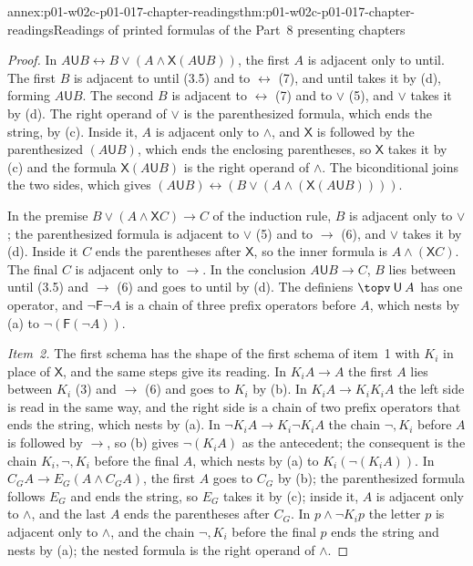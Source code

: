 \begin{annexitem}{annex:p01-w02c-p01-017-chapter-readings}{thm:p01-w02c-p01-017-chapter-readings}{Readings of printed formulas of the Part~8 presenting chapters}
\begin{proof}
In \(A\mathbin{\mathsf U}B\leftrightarrow B\lor(A\land\mathsf
X(A\mathbin{\mathsf U}B))\), the first \(A\) is adjacent only to until.
The first \(B\) is adjacent to until (3.5) and to \(\leftrightarrow\)
(7), and until takes it by (d), forming \(A\mathbin{\mathsf U}B\).  The
second \(B\) is adjacent to \(\leftrightarrow\) (7) and to \(\lor\) (5),
and \(\lor\) takes it by (d).  The right operand of \(\lor\) is the
parenthesized formula, which ends the string, by (c).  Inside it, \(A\) is
adjacent only to \(\land\), and \(\mathsf X\) is followed by the
parenthesized \((A\mathbin{\mathsf U}B)\), which ends the enclosing
parentheses, so \(\mathsf X\) takes it by (c) and the formula
\(\mathsf X(A\mathbin{\mathsf U}B)\) is the right operand of \(\land\).
The biconditional joins the two sides, which gives
\((A\mathbin{\mathsf U}B)\leftrightarrow(B\lor(A\land(\mathsf
X(A\mathbin{\mathsf U}B))))\).

In the premise \(B\lor(A\land\mathsf XC)\to C\) of the induction rule,
\(B\) is adjacent only to \(\lor\); the parenthesized formula is adjacent
to \(\lor\) (5) and to \(\to\) (6), and \(\lor\) takes it by (d).  Inside
it \(C\) ends the parentheses after \(\mathsf X\), so the inner formula is
\(A\land(\mathsf XC)\).  The final \(C\) is adjacent only to \(\to\).  In
the conclusion \(A\mathbin{\mathsf U}B\to C\), \(B\) lies between until
(3.5) and \(\to\) (6) and goes to until by (d).  The definiens
\(\topv\mathbin{\mathsf U}A\) has one operator, and
\(\neg\mathsf F\neg A\) is a chain of three prefix operators before
\(A\), which nests by (a) to \(\neg(\mathsf F(\neg A))\).

\emph{Item~2.}  The first schema has the shape of the first schema of
item~1 with \(K_i\) in place of \(\mathsf X\), and the same steps give its
reading.  In \(K_iA\to A\) the first \(A\) lies between \(K_i\) (3) and
\(\to\) (6) and goes to \(K_i\) by (b).  In \(K_iA\to K_iK_iA\) the left
side is read in the same way, and the right side is a chain of two prefix
operators that ends the string, which nests by (a).  In
\(\neg K_iA\to K_i\neg K_iA\) the chain \(\neg,K_i\) before \(A\) is
followed by \(\to\), so (b) gives \(\neg(K_iA)\) as the antecedent; the
consequent is the chain \(K_i,\neg,K_i\) before the final \(A\), which
nests by (a) to \(K_i(\neg(K_iA))\).  In
\(C_GA\to E_G(A\land C_GA)\), the first \(A\) goes to \(C_G\) by (b); the
parenthesized formula follows \(E_G\) and ends the string, so \(E_G\)
takes it by (c); inside it, \(A\) is adjacent only to \(\land\), and the
last \(A\) ends the parentheses after \(C_G\).  In \(p\land\neg K_ip\) the
letter \(p\) is adjacent only to \(\land\), and the chain \(\neg,K_i\)
before the final \(p\) ends the string and nests by (a); the nested
formula is the right operand of \(\land\).


\end{proof}
\end{annexitem}
